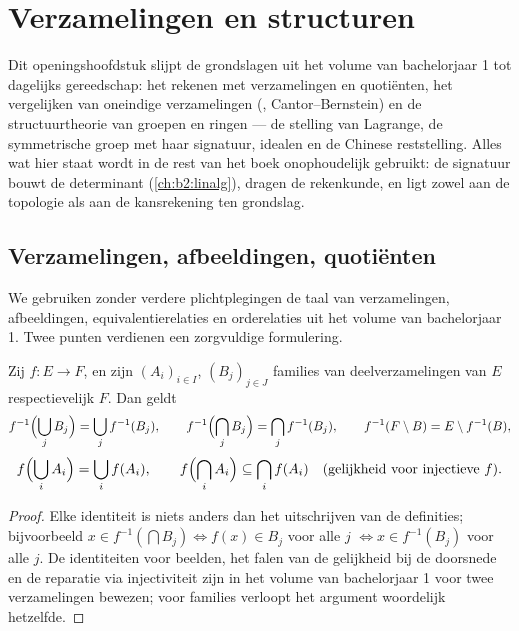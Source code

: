 \chapter{Verzamelingen en structuren}\label{ch:b2:structures}

Dit openingshoofdstuk slijpt de grondslagen uit het volume van
bachelorjaar 1 tot dagelijks gereedschap: het rekenen met
verzamelingen en quotiënten, het vergelijken van oneindige
verzamelingen (, Cantor--Bernstein) en de
structuurtheorie van groepen en ringen --- de stelling van
Lagrange, de symmetrische groep met haar signatuur, idealen en de
Chinese reststelling. Alles wat hier staat wordt in de rest van het
boek onophoudelijk gebruikt: de signatuur bouwt de determinant
(\cref{ch:b2:linalg}),  dragen de rekenkunde, en
 ligt zowel aan de topologie als aan de kansrekening
ten grondslag.

\section{Verzamelingen, afbeeldingen, quotiënten}

We gebruiken zonder verdere plichtplegingen de taal van
verzamelingen, afbeeldingen, equivalentierelaties en orderelaties
uit het volume van bachelorjaar 1. Twee punten verdienen een
zorgvuldige formulering.

\begin{proposition}\label{prop:b2:structures:images}
Zij $f \colon E \to F$, en zijn $(A_i)_{i \in I}$, $(B_j)_{j \in J}$
families van deelverzamelingen van $E$ respectievelijk $F$. Dan
geldt
\[
f^{-1}\Bigl(\bigcup_j B_j\Bigr) = \bigcup_j f^{-1}(B_j),
\qquad
f^{-1}\Bigl(\bigcap_j B_j\Bigr) = \bigcap_j f^{-1}(B_j),
\qquad
f^{-1}(F \setminus B) = E \setminus f^{-1}(B),
\]
\[
f\Bigl(\bigcup_i A_i\Bigr) = \bigcup_i f(A_i),
\qquad
f\Bigl(\bigcap_i A_i\Bigr) \subseteq \bigcap_i f(A_i)
\quad (\text{gelijkheid voor injectieve } f).
\]
\end{proposition}

\begin{proof}
Elke identiteit is niets anders dan het uitschrijven van de
definities; bijvoorbeeld $x \in f^{-1}(\bigcap B_j) \iff f(x) \in
B_j$ voor alle $j$ $\iff x \in f^{-1}(B_j)$ voor alle $j$. De
identiteiten voor beelden, het falen van de gelijkheid bij de
doorsnede en de reparatie via injectiviteit zijn in het volume van
bachelorjaar 1 voor twee verzamelingen bewezen; voor families
verloopt het argument woordelijk hetzelfde.
\end{proof}

